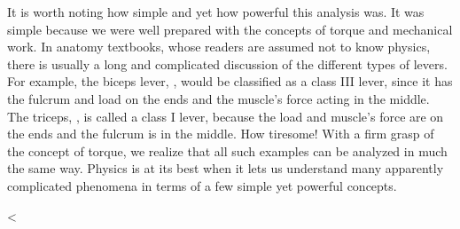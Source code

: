 It is worth noting how simple and yet how powerful this
analysis was. It was simple because we were well prepared
with the concepts of torque and mechanical work. In anatomy
textbooks, whose readers are assumed not to know physics,
there is usually a long and complicated discussion of the
different types of levers. For example, the biceps lever,
, would be classified as a class III lever, since it has
the fulcrum and load on the ends and the muscle's force
acting in the middle. The triceps, , is called a class I
lever, because the load and muscle's force are on the ends
and the fulcrum is in the middle. How tiresome! With a firm
grasp of the concept of torque, we realize that all such
examples can be analyzed in much the same way. Physics is at
its best when it lets us understand many apparently
complicated phenomena in terms of a few simple yet powerful concepts.

\vfill

<%
